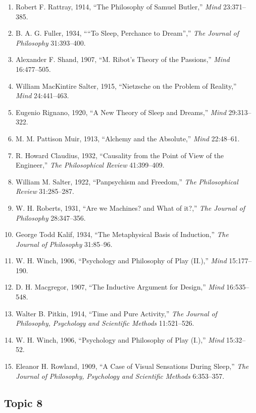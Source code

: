\documentclass[
]{article}
\begin{document}
\begin{enumerate}
\def\labelenumi{\arabic{enumi}.}
\item
  Robert F. Rattray, 1914, ``The Philosophy of Samuel Butler,''
  \emph{Mind} 23:371--385.
\item
  B. A. G. Fuller, 1934, ````To Sleep, Perchance to Dream'','' \emph{The
  Journal of Philosophy} 31:393--400.
\item
  Alexander F. Shand, 1907, ``M. Ribot's Theory of the Passions,''
  \emph{Mind} 16:477--505.
\item
  William MacKintire Salter, 1915, ``Nietzsche on the Problem of
  Reality,'' \emph{Mind} 24:441--463.
\item
  Eugenio Rignano, 1920, ``A New Theory of Sleep and Dreams,''
  \emph{Mind} 29:313--322.
\item
  M. M. Pattison Muir, 1913, ``Alchemy and the Absolute,'' \emph{Mind}
  22:48--61.
\item
  R. Howard Claudius, 1932, ``Causality from the Point of View of the
  Engineer,'' \emph{The Philosophical Review} 41:399--409.
\item
  William M. Salter, 1922, ``Panpsychism and Freedom,'' \emph{The
  Philosophical Review} 31:285--287.
\item
  W. H. Roberts, 1931, ``Are we Machines? and What of it?,'' \emph{The
  Journal of Philosophy} 28:347--356.
\item
  George Todd Kalif, 1934, ``The Metaphysical Basis of Induction,''
  \emph{The Journal of Philosophy} 31:85--96.
\item
  W. H. Winch, 1906, ``Psychology and Philosophy of Play (II.),''
  \emph{Mind} 15:177--190.
\item
  D. H. Macgregor, 1907, ``The Inductive Argument for Design,''
  \emph{Mind} 16:535--548.
\item
  Walter B. Pitkin, 1914, ``Time and Pure Activity,'' \emph{The Journal
  of Philosophy, Psychology and Scientific Methods} 11:521--526.
\item
  W. H. Winch, 1906, ``Psychology and Philosophy of Play (I.),''
  \emph{Mind} 15:32--52.
\item
  Eleanor H. Rowland, 1909, ``A Case of Visual Sensations During
  Sleep,'' \emph{The Journal of Philosophy, Psychology and Scientific
  Methods} 6:353--357.
\end{enumerate}

\newpage

\hypertarget{topic-8}{%
\subsection{Topic 8}\label{topic-8}}
\end{document}
